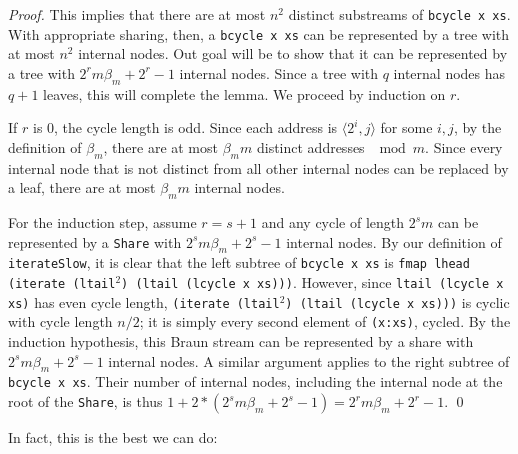 \documentclass[envcountsect]{llncs}
\newcommand{\share}{{\tt Share} }
\begin{document}
\begin{proof}
This implies that there are at most $n^2$ distinct substreams of {\tt bcycle x xs}.
With appropriate sharing, then, a {\tt bcycle x xs} can be represented by a tree with at most $n^2$ internal nodes.
Out goal will be to show that it can be represented by a tree with $2^r m \beta_m + 2^r - 1$ internal nodes.
Since a tree with $q$ internal nodes has $q+1$ leaves, this will complete the lemma.
We proceed by induction on $r$. 

If $r$ is $0$, the cycle length is odd.
Since each address is $\langle 2^i,j \rangle$ for some $i, j$, by the definition of $\beta_m$, there are at most $\beta_m m$ distinct addresses $\mod m$.
Since every internal node that is not distinct from all other internal nodes can be replaced by a leaf, there are at most $\beta_m m$ internal nodes.

For the induction step, assume $r = s+1$ and any cycle of length $2^s m$ can be represented by a \share with $2^s m \beta_m + 2^s - 1$ internal nodes.
By our definition of {\tt iterateSlow}, it is clear that the left subtree of {\tt bcycle x xs} is {\tt fmap lhead (iterate (ltail}$^2${\tt ) (ltail (lcycle x xs)))}.
However, since {\tt ltail (lcycle x xs)} has even cycle length, {\tt (iterate (ltail}$^2${\tt ) (ltail (lcycle x xs)))} is cyclic with cycle length $n/2$;
it is simply every second element of {\tt (x:xs)}, cycled.
By the induction hypothesis, this Braun stream can be represented by a share with $2^s m \beta_m + 2^s - 1$ internal nodes.
A similar argument applies to the right subtree of {\tt bcycle x xs}.
Their number of internal nodes, including the internal node at the root of the {\tt Share}, is thus $1+2*(2^s m \beta_m + 2^s - 1) = 2^r m \beta_m + 2^r - 1$.
\qed
\end{proof}

In fact, this is the best we can do:
\end{document}
